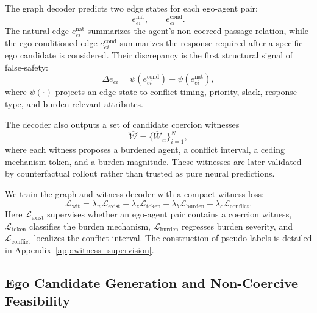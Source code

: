 \documentclass[10pt]{article}
\begin{document}
The graph decoder predicts two edge states for each ego-agent pair:
\begin{equation}
    e^{\mathrm{nat}}_{ei}, \qquad e^{\mathrm{cond}}_{ei}.
\end{equation}
The natural edge $e^{\mathrm{nat}}_{ei}$ summarizes the agent's non-coerced passage relation, while the ego-conditioned edge $e^{\mathrm{cond}}_{ei}$ summarizes the response required after a specific ego candidate is considered. Their discrepancy is the first structural signal of false-safety:
\begin{equation}
    \Delta e_{ei}
    =
    \psi(e^{\mathrm{cond}}_{ei})-\psi(e^{\mathrm{nat}}_{ei}),
\end{equation}
where $\psi(\cdot)$ projects an edge state to conflict timing, priority, slack, response type, and burden-relevant attributes.

The decoder also outputs a set of candidate coercion witnesses
\begin{equation}
    \widehat{\mathcal{W}} =
    \{ \widehat{W}_{ei} \}_{i=1}^{N},
\end{equation}
where each witness proposes a burdened agent, a conflict interval, a ceding mechanism token, and a burden magnitude. These witnesses are later validated by counterfactual rollout rather than trusted as pure neural predictions.

We train the graph and witness decoder with a compact witness loss:
\begin{equation}
    \mathcal{L}_{\mathrm{wit}}
    =
    \lambda_w \mathcal{L}_{\mathrm{exist}}
    +
    \lambda_z \mathcal{L}_{\mathrm{token}}
    +
    \lambda_b \mathcal{L}_{\mathrm{burden}}
    +
    \lambda_c \mathcal{L}_{\mathrm{conflict}} .
\end{equation}
Here $\mathcal{L}_{\mathrm{exist}}$ supervises whether an ego-agent pair contains a coercion witness, $\mathcal{L}_{\mathrm{token}}$ classifies the burden mechanism, $\mathcal{L}_{\mathrm{burden}}$ regresses burden severity, and $\mathcal{L}_{\mathrm{conflict}}$ localizes the conflict interval. The construction of pseudo-labels is detailed in Appendix~\ref{app:witness_supervision}.

\subsection{Ego Candidate Generation and Non-Coercive Feasibility}
\label{sec:method_candidate}
\end{document}
